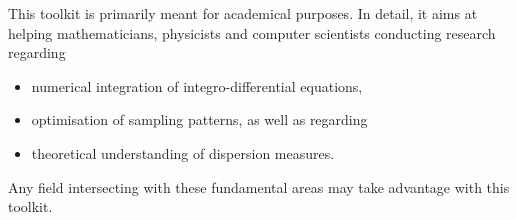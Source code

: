 %
This toolkit is primarily meant for academical purposes. In detail, it aims at helping mathematicians, physicists and computer scientists conducting research regarding
\begin{itemize}
  \item numerical integration of integro-differential equations,
  \item optimisation of sampling patterns, as well as regarding
  \item theoretical understanding of dispersion measures.
\end{itemize}
Any field intersecting with these fundamental areas may take advantage with this toolkit.

